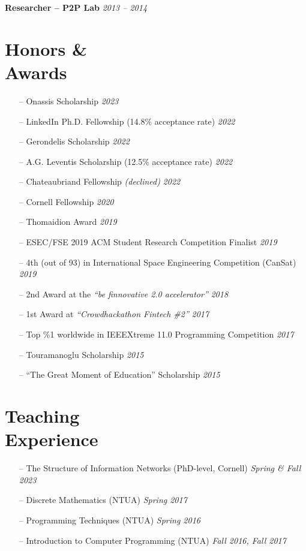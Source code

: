 \documentclass[margin]{res}
\begin{document}
\begin{resume}
\textbf{Researcher -- P2P Lab}  \hfill {\emph{2013 -- 2014}}



\section{Honors \& \\ Awards} 
\begin{itemize}[nosep]
	\item[--] Onassis Scholarship \hfill \emph{2023}
	\item[--] LinkedIn Ph.D. Fellowship (14.8\% acceptance rate) \hfill \emph{2022} 	
	\item[--] Gerondelis Scholarship \hfill \emph{2022}
	\item[--] A.G. Leventis Scholarship (12.5\% acceptance rate) \hfill \emph{2022}
	\item[--] Chateaubriand Fellowship \emph{(declined)} \hfill \emph{2022}
	\item[--] Cornell Fellowship \hfill \emph{2020}
	\item[--] Thomaidion Award \hfill \emph{2019}
	\item[--] ESEC/FSE 2019 ACM Student Research Competition Finalist \hfill \emph{2019}

	\item[--] 4th (out of 93) in International Space Engineering  Competition (CanSat) \hfill \emph{2019}
    \item[--] 2nd Award at the \emph{``be finnovative 2.0 accelerator''} \hfill \emph{2018}
   	\item[--] 1st Award at \emph{``Crowdhackathon Fintech \#2''} \hfill \emph{2017}
   	\item[--] Top \%1 worldwide in IEEEXtreme 11.0 Programming Competition \hfill \emph{2017}
    \item [--] Touramanoglu Scholarship \hfill \emph{2015}
    \item [--] ``The Great Moment of Education'' Scholarship \hfill \emph{2015}

\end{itemize}

\section{Teaching \\ Experience} 
\begin{itemize}[nosep]
	\item[--] The Structure of Information Networks (PhD-level, Cornell) \hfill \emph{Spring \& Fall 2023} 
    \item[--] Discrete Mathematics (NTUA) \hfill \emph{Spring 2017}
    \item[--] Programming Techniques (NTUA) \hfill \emph{Spring 2016}
    \item[--] Introduction to Computer Programming (NTUA) \hfill \emph{Fall 2016, Fall 2017}
\end{itemize}



\end{resume}
\end{document}
